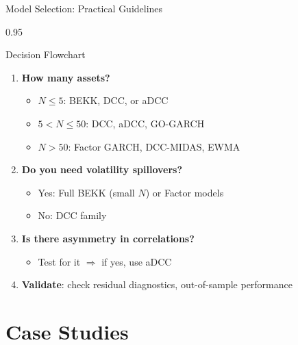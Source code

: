 \documentclass[9pt, aspectratio=169, t]{beamer}
\begin{document}
\begin{frame}{Model Selection: Practical Guidelines}
    \begin{cminipage}{0.95\textwidth}
    {\footnotesize
    \begin{block}{Decision Flowchart}
        \begin{enumerate}\setlength{\itemsep}{2pt}
            \item \textbf{How many assets?}
                \begin{itemize}\setlength{\itemsep}{0pt}
                    \item $N \leq 5$: BEKK, DCC, or aDCC
                    \item $5 < N \leq 50$: DCC, aDCC, GO-GARCH
                    \item $N > 50$: Factor GARCH, DCC-MIDAS, EWMA
                \end{itemize}
            \item \textbf{Do you need volatility spillovers?}
                \begin{itemize}\setlength{\itemsep}{0pt}
                    \item Yes: Full BEKK (small $N$) or Factor models
                    \item No: DCC family
                \end{itemize}
            \item \textbf{Is there asymmetry in correlations?}
                \begin{itemize}\setlength{\itemsep}{0pt}
                    \item Test for it $\Rightarrow$ if yes, use aDCC
                \end{itemize}
            \item \textbf{Validate}: check residual diagnostics, out-of-sample performance
        \end{enumerate}
    \end{block}
    }
    \end{cminipage}
\end{frame}

\section{Case Studies}
\end{document}
